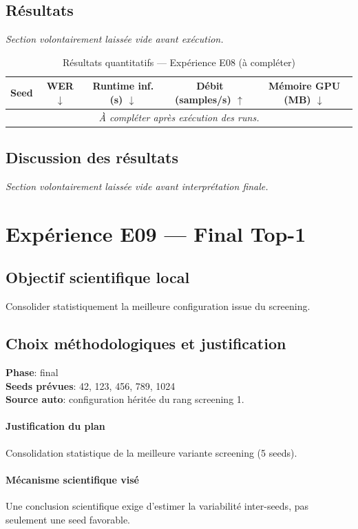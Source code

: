 \documentclass[11pt,a4paper]{article}
\begin{document}
\subsection{Résultats}
\textit{Section volontairement laissée vide avant exécution.}

\begin{table}[H]
\centering
\caption{Résultats quantitatifs --- Expérience E08 (à compléter)}
\begin{tabular}{lcccc}
\toprule
Seed & WER $\downarrow$ & Runtime inf. (s) $\downarrow$ & Débit (samples/s) $\uparrow$ & Mémoire GPU (MB) $\downarrow$ \\
\midrule
\multicolumn{5}{c}{\textit{À compléter après exécution des runs.}} \\
\bottomrule
\end{tabular}
\end{table}

\subsection{Discussion des résultats}
\textit{Section volontairement laissée vide avant interprétation finale.}


\section{Expérience E09 --- Final Top-1}
\subsection{Objectif scientifique local}
Consolider statistiquement la meilleure configuration issue du screening.

\subsection{Choix méthodologiques et justification}
\textbf{Phase}: final\\
\textbf{Seeds prévues}: 42, 123, 456, 789, 1024\\
\textbf{Source auto}: configuration héritée du rang screening 1.

\paragraph{Justification du plan}
Consolidation statistique de la meilleure variante screening (5 seeds).

\paragraph{Mécanisme scientifique visé}
Une conclusion scientifique exige d'estimer la variabilité inter-seeds, pas seulement une seed favorable.
\end{document}
